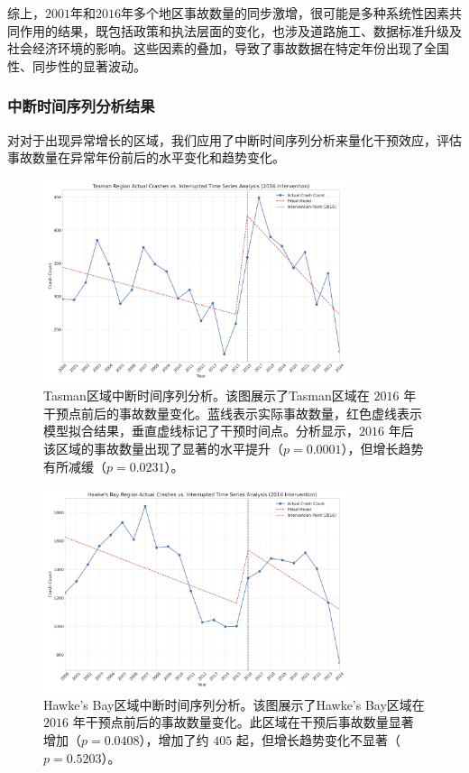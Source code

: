 \documentclass[12pt,a4paper]{article}
\begin{document}
综上，$2001$年和$2016$年多个地区事故数量的同步激增，很可能是多种系统性因素共同作用的结果，既包括政策和执法层面的变化，也涉及道路施工、数据标准升级及社会经济环境的影响。这些因素的叠加，导致了事故数据在特定年份出现了全国性、同步性的显著波动。

\subsubsection{中断时间序列分析结果}

对对于出现异常增长的区域，我们应用了中断时间序列分析来量化干预效应，评估事故数量在异常年份前后的水平变化和趋势变化。

\begin{figure}[H]
\centering
\includegraphics[width=0.8\textwidth]{region_Tasman_Region_its_analysis.png}
\caption{Tasman区域中断时间序列分析。该图展示了Tasman区域在 $2016$ 年干预点前后的事故数量变化。蓝线表示实际事故数量，红色虚线表示模型拟合结果，垂直虚线标记了干预时间点。分析显示，$2016$ 年后该区域的事故数量出现了显著的水平提升（$p=0.0001$），但增长趋势有所减缓（$p=0.0231$）。}
\label{fig:tasman_its}
\end{figure}

\begin{figure}[H]
\centering
\includegraphics[width=0.8\textwidth]{region_Hawke's_Bay_Region_its_analysis.png}
\caption{Hawke's Bay区域中断时间序列分析。该图展示了Hawke's Bay区域在 $2016$ 年干预点前后的事故数量变化。此区域在干预后事故数量显著增加（$p=0.0408$），增加了约 $405$ 起，但增长趋势变化不显著（$p=0.5203$）。}
\label{fig:hawkes_bay_its}
\end{figure}
\end{document}
